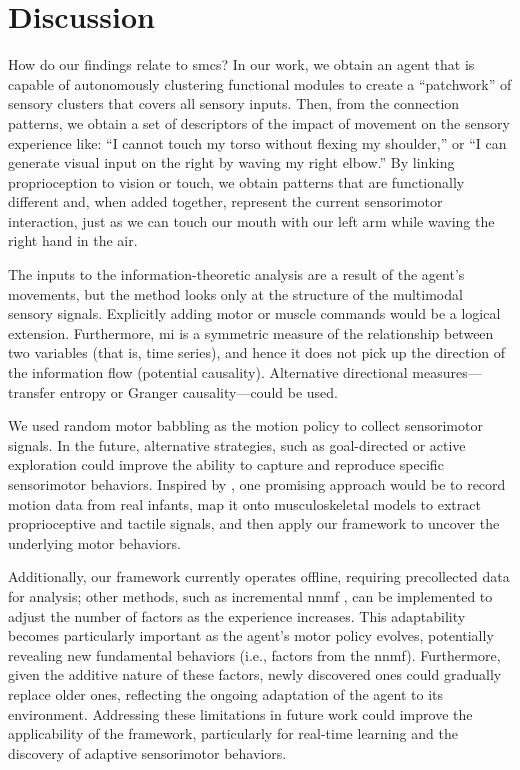 \documentclass[letterpaper, 10 pt, conference]{ieeeconf}  %
\begin{document}
\section{Discussion}
How do our findings relate to \acp{smc}? In our work, we obtain an agent that is capable of autonomously clustering functional modules to create a ``patchwork'' of sensory clusters that covers all sensory inputs. Then, from the connection patterns, we obtain a set of descriptors of the impact of movement on the sensory experience like: ``I cannot touch my torso without flexing my shoulder,'' or ``I can generate visual input on the right by waving my right elbow.'' By linking proprioception to vision or touch, we obtain patterns that are functionally different and, when added together, represent the current sensorimotor interaction, just as we can touch our mouth with our left arm while waving the right hand in the air. 


The inputs to the information-theoretic analysis are a result of the agent's movements, but the method looks only at the structure of the multimodal sensory signals. Explicitly adding motor or muscle commands would be a logical extension. Furthermore, \ac{mi} is a symmetric measure of the relationship between two variables (that is, time series), and hence it does not pick up the direction of the information flow (potential causality). Alternative directional measures---transfer entropy or Granger causality---could be used.

We used random motor babbling as the motion policy to collect sensorimotor signals. In the future, alternative strategies, such as goal-directed or active exploration could improve the ability to capture and reproduce specific sensorimotor behaviors. Inspired by \cite{Kanazawa2023Openendedmovements}, one promising approach would be to record motion data from real infants, map it onto musculoskeletal models to extract proprioceptive and tactile signals, and then apply our framework to uncover the underlying motor behaviors. 

Additionally, our framework currently operates offline, requiring precollected data for analysis; other methods, such as incremental \ac{nnmf} \cite{Bucak2007}, can be implemented to adjust the number of factors as the experience increases. This adaptability becomes particularly important as the agent's motor policy evolves, potentially revealing new fundamental behaviors (i.e., factors from the \acl{nnmf}). Furthermore, given the additive nature of these factors, newly discovered ones could gradually replace older ones, reflecting the ongoing adaptation of the agent to its environment. Addressing these limitations in future work could improve the applicability of the framework, particularly for real-time learning and the discovery of adaptive sensorimotor behaviors.

\printbibliography 
\end{document}
